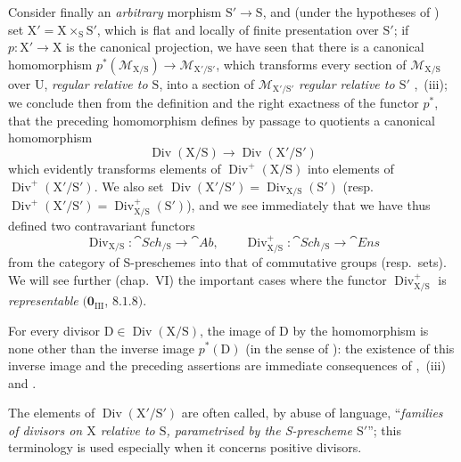 \begin{env}[21.15.9]
\label{IV.21.15.9}
Consider finally an \emph{arbitrary} morphism $\mathrm{S}'\to\mathrm{S}$, and (under the hypotheses of ) set $\mathrm{X}'=\mathrm{X}\times_{\mathrm{S}}\mathrm{S}'$, which is flat and locally of finite presentation over $\mathrm{S}'$; if $p:\mathrm{X}'\to\mathrm{X}$ is the canonical projection, we have seen  that there is a canonical homomorphism $p^*(\mathscr{M}_{\mathrm{X}/\mathrm{S}})\to\mathscr{M}_{\mathrm{X}'/\mathrm{S}'}$, which transforms every section of $\mathscr{M}_{\mathrm{X}/\mathrm{S}}$ over $\mathrm{U}$, \emph{regular relative to $\mathrm{S}$}, into a section of $\mathscr{M}_{\mathrm{X}'/\mathrm{S}'}$ \emph{regular relative to $\mathrm{S}'$} ,~(iii); we conclude then from the definition  and the right exactness of the functor $p^*$, that the preceding homomorphism defines by passage to quotients a canonical homomorphism
\[
\label{IV.21.15.9.1}
  \operatorname{Div}(\mathrm{X}/\mathrm{S})\to\operatorname{Div}(\mathrm{X}'/\mathrm{S}')
  \tag{21.15.9.1}
\]
which evidently transforms elements of $\operatorname{Div}^+(\mathrm{X}/\mathrm{S})$ into elements of $\operatorname{Div}^+(\mathrm{X}'/\mathrm{S}')$.
We also set $\operatorname{Div}(\mathrm{X}'/\mathrm{S}')=\operatorname{Div}_{\mathrm{X}/\mathrm{S}}(\mathrm{S}')$ (resp.\ $\operatorname{Div}^+(\mathrm{X}'/\mathrm{S}')=\operatorname{Div}_{\mathrm{X}/\mathrm{S}}^+(\mathrm{S}')$), and we see immediately that we have thus defined two contravariant functors
\[
  \operatorname{Div}_{\mathrm{X}/\mathrm{S}}:\cat{Sch}_{/\mathrm{S}}\to\cat{Ab},\qquad\operatorname{Div}_{\mathrm{X}/\mathrm{S}}^+:\cat{Sch}_{/\mathrm{S}}\to\cat{Ens}
\]
from the category of S-preschemes into that of commutative groups (resp.\ sets).
We will see further (chap.~VI) the important cases where the functor $\operatorname{Div}_{\mathrm{X}/\mathrm{S}}^+$ is \emph{representable} $(\mathbf{0}_{\mathrm{III}}$, $8.1.8)$.

For every divisor $\mathrm{D}\in\operatorname{Div}(\mathrm{X}/\mathrm{S})$, the image of $\mathrm{D}$ by the homomorphism  is none other than the inverse image $p^*(\mathrm{D})$ (in the sense of ): the existence of this inverse image and the preceding assertions are immediate consequences of ,~(iii) and .

The elements of $\operatorname{Div}(\mathrm{X}'/\mathrm{S}')$ are often called, by abuse of language, ``\emph{families of divisors on $\mathrm{X}$ relative to $\mathrm{S}$, parametrised by the S-prescheme $\mathrm{S}'$}''; this terminology is used especially when it concerns positive divisors.
\end{env}
